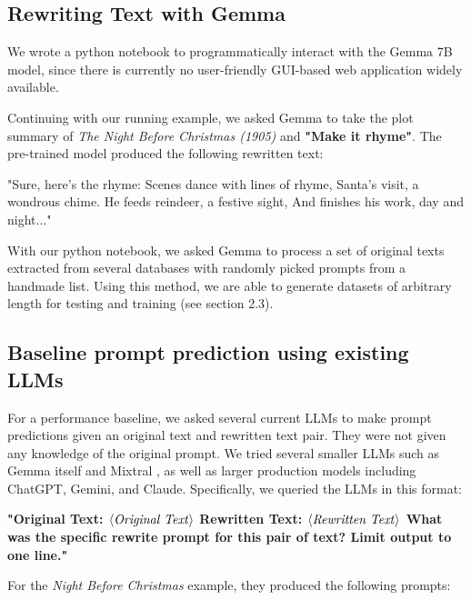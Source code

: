 \documentclass{article}
\theoremstyle{plain}
\theoremstyle{definition}
\theoremstyle{remark}
\begin{document}
\subsection{Rewriting Text with Gemma}
We wrote a python notebook to programmatically interact with the Gemma 7B model, since there is currently no user-friendly GUI-based web application widely available. 

Continuing with our running example, we asked Gemma to take the plot summary of \textit{The Night Before Christmas (1905)} and \textbf{"Make it rhyme"}. The pre-trained model produced the following rewritten text:

\begin{displayquote}
"Sure, here's the rhyme: Scenes dance with lines of rhyme, Santa's visit, a wondrous chime. He feeds reindeer, a festive sight, And finishes his work, day and night..."
\end{displayquote}

With our python notebook, we asked Gemma to process a set of original texts extracted from several databases with randomly picked prompts from a handmade list. Using this method, we are able to generate datasets of arbitrary length for testing and training (see section 2.3).

\subsection{Baseline prompt prediction using existing LLMs}
For a performance baseline, we asked several current LLMs to make prompt predictions given an original text and rewritten text pair. They were not given any knowledge of the original prompt. We tried several smaller LLMs such as Gemma itself and Mixtral \cite{jiang2024mixtral}, as well as larger production models including ChatGPT, Gemini, and Claude. Specifically, we queried the LLMs in this format: 
\begin{displayquote}
\textbf{"Original Text: $\langle \text{\textit{Original Text}} \rangle$ Rewritten Text: $\langle \text{\textit{Rewritten Text}} \rangle$ What was the specific rewrite prompt for this pair of text? Limit output to one line."}
\end{displayquote}

For the \textit{Night Before Christmas} example, they produced the following prompts:
\end{document}
